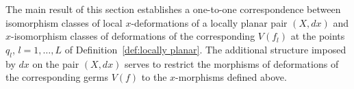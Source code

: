 \documentclass[11pt,twoside]{amsart}
\theoremstyle{plain}
\newcommand{\dfx}{dx}
\begin{document}
The main result of this section establishes a one-to-one correspondence between isomorphism classes of local $x$-deformations of a locally planar pair $(X,\dfx)$ and $x$-isomorphism classes of deformations of the corresponding $V(f_l)$ at the points $q_l$, $l=1,\ldots,L$ of Definition~\ref{def:locally planar}.
 The additional structure imposed by $\dfx$ on the pair $(X,\dfx)$ serves to restrict the morphisms of deformations of the corresponding germs $ V (f) $ to the $x$-morphisms defined above. 
 

\end{document}
